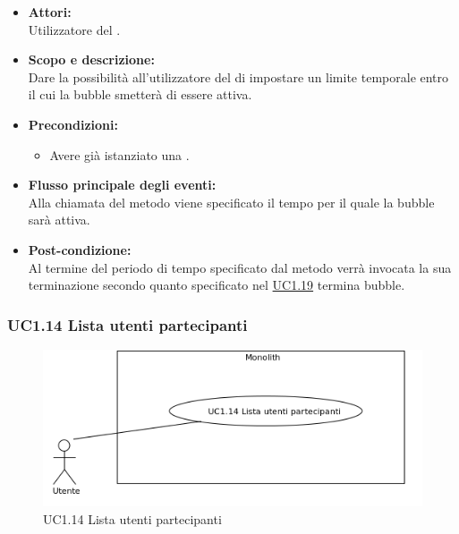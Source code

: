\begin{itemize}
	\item \textbf{Attori:}
	\\Utilizzatore del .
	\item \textbf{Scopo e descrizione:} 
	\\Dare la possibilità all'utilizzatore del  di impostare un limite temporale entro il cui la bubble smetterà di essere attiva.
	\item \textbf{Precondizioni:}
	\begin{itemize}
		\item Avere già istanziato una .
	\end{itemize}
	\item \textbf{Flusso principale degli eventi:}
	\\Alla chiamata del metodo viene specificato il tempo per il quale la bubble sarà attiva.
	\item \textbf{Post-condizione:}
	\\Al termine del periodo di tempo specificato dal metodo verrà invocata la sua terminazione secondo quanto specificato nel  \hyperref[UC1.19]{UC1.19} termina bubble.
\end{itemize}

\subsubsection{UC1.14 Lista utenti partecipanti} \label{UC1.14}

\begin{figure}[H]
	\centering
	\includegraphics[width=15cm]{../../documenti/AnalisiDeiRequisiti/Diagrammi_img/uc1_14.png}
	\caption{UC1.14 Lista utenti partecipanti}
\end{figure}

